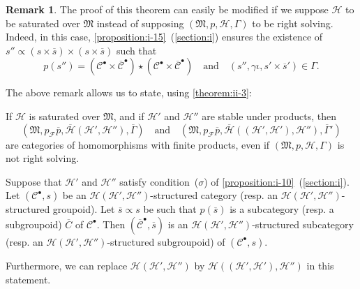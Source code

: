 \documentclass[a4paper,fleqn]{article}
\theoremstyle{plain}
\newenvironment{theorem}[1]
  {\renewcommand\theinnertheorem{#1}\innertheorem}
  {\endinnertheorem}
\theoremstyle{definition}
\newtheorem*{remark}{Remark}
\newcommand{\oldpage}[1]{{\marginpar{\footnotesize$\bigg\vert$\,\,\,\,\textit{p.~#1}}}}
\newcommand{\textand}{\quad\text{and}\quad}
\newcommand{\CC}{\mathcal{C}}
\newcommand{\HH}{\mathcal{H}}
\newcommand{\MM}{\mathfrak{M}}
\newcommand{\FF}{\mathcal{F}}
\newcommand{\subs}{\mathrel{\propto}}
\begin{document}
\begin{remark}
  The proof of this theorem can easily be modified if we suppose $\HH$ to be saturated over $\MM$ instead of supposing $(\MM,p,\HH,\Gamma)$ to be right solving.
  Indeed, in this case, \cref{proposition:i-15}~(\cref{section:i}) ensures the existence of $s''\subs(s\times\overline{s})\times(s\times\overline{s})$ such that
  \[
    p(s'')=(\CC^\bullet\times\overline{\CC}^\bullet)\star(\CC^\bullet\times\overline{\CC}^\bullet)
    \textand
    (s'',\gamma\iota,s'\times\overline{s}')\in\Gamma.
  \]
\end{remark}

The above remark allows us to state, using \cref{theorem:ii-3}:

\begin{theorem}{13~bis}
\label{theorem:ii-13bis}
  If $\HH$ is saturated over $\MM$, and if $\HH'$ and $\HH''$ are stable under products, then
  \[
    (\MM,p_\FF\overline{p},\overline{\HH}(\HH',\HH''),\overline{\Gamma})
    \textand
    (\MM,p_\FF\overline{p},\overline{\HH}((\HH',\HH'),\HH''),\overline{\Gamma}')
  \]
  are categories of homomorphisms with finite products, even if $(\MM,p,\HH,\Gamma)$ is not right solving.
\end{theorem}

\begin{theorem}{14}
\label{theorem:ii-14}
  Suppose that $\HH'$ and $\HH''$ satisfy condition~($\sigma$) of \cref{proposition:i-10}~(\cref{section:i}).
  Let $(\CC^\bullet,s)$ be an $\HH(\HH',\HH'')$-structured category (resp. an $\HH(\HH',\HH'')$-structured groupoid).
  Let $\overline{s}\subs s$ be such that $p(\overline{s})$ is a subcategory (resp. a subgroupoid) $\overline{C}$ of $\CC^\bullet$.
  \oldpage{416}
  Then $(\overline{\CC}^\bullet,\overline{s})$ is an $\HH(\HH',\HH'')$-structured subcategory (resp. an $\HH(\HH',\HH'')$-structured subgroupoid) of $(\CC^\bullet,s)$.

  Furthermore, we can replace $\HH(\HH',\HH'')$ by $\HH((\HH',\HH'),\HH'')$ in this statement.
\end{theorem}
\end{document}
